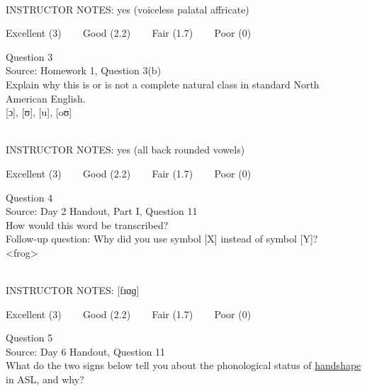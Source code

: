\documentclass[12pt]{article}
\begin{document}
~\\
INSTRUCTOR NOTES: yes (voiceless palatal affricate)


\vfill
Excellent (3) ~~~ Good (2.2) ~~~ Fair (1.7) ~~~ Poor (0)
\newpage

{\large Question 3}\\

Source: Homework 1, Question 3(b)\\

Explain why this is or is not a complete natural class in standard North American English.\\

{[ɔ]}, {[ʊ]}, {[u]}, {[oʊ]}


~\\
INSTRUCTOR NOTES: yes (all back rounded vowels)


\vfill
Excellent (3) ~~~ Good (2.2) ~~~ Fair (1.7) ~~~ Poor (0)
\newpage

{\large Question 4}\\

Source: Day 2 Handout, Part I, Question 11\\

How would this word be transcribed?\\ Follow-up question: Why did you use symbol [X] instead of symbol [Y]?\\

<frog>


~\\
INSTRUCTOR NOTES: [fɹɑɡ]


\vfill
Excellent (3) ~~~ Good (2.2) ~~~ Fair (1.7) ~~~ Poor (0)
\newpage

{\large Question 5}\\

Source: Day 6 Handout, Question 11\\

What do the two signs below tell you about the phonological status of \underline{handshape} in ASL, and why?\\
\end{document}
